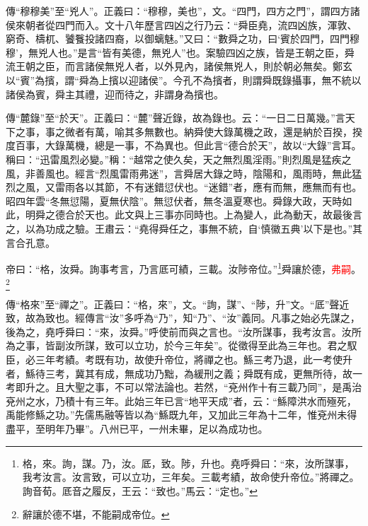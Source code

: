 {\noindent\zhuan{}\fzbyks 傳“穆穆美”至“兇人”。正義曰：“穆穆，美也”，文。“四門，四方之門”，謂四方諸侯來朝者從四門而入。文十八年歷言四凶之行乃云：“舜臣堯，流四凶族，渾敦、窮奇、檮杌、饕餮投諸四裔，以御螭魅。”又曰：“數舜之功，曰‘賓於四門，四門穆穆’，無兇人也。”是言“皆有美德，無兇人”也。案驗四凶之族，皆是王朝之臣，舜流王朝之臣，而言諸侯無兇人者，以外見內，諸侯無兇人，則於朝必無矣。鄭玄以“賓”為擯，謂“舜為上擯以迎諸侯”。今孔不為擯者，則謂舜既錄攝事，無不統以諸侯為賓，舜主其禮，迎而待之，非謂身為擯也。 \par}

{\noindent\zhuan{}\fzbyks 傳“麓錄”至“於天”。正義曰：“麓”聲近錄，故為錄也。云：“一日二日萬幾。”言天下之事，事之微者有萬，喻其多無數也。納舜使大錄萬機之政，還是納於百揆，揆度百事，大錄萬機，總是一事，不為異也。但此言“德合於天”，故以“大錄”言耳。稱曰：“迅雷風烈必變。”稱：“越常之使久矣，天之無烈風淫雨。”則烈風是猛疾之風，非善風也。經言“烈風雷雨弗迷”，言舜居大錄之時，陰陽和，風雨時，無此猛烈之風，又雷雨各以其節，不有迷錯愆伏也。“迷錯”者，應有而無，應無而有也。昭四年雲“冬無愆陽，夏無伏陰”。無愆伏者，無冬溫夏寒也。舜錄大政，天時如此，明舜之德合於天也。此文與上三事亦同時也。上為變人，此為動天，故最後言之，以為功成之驗。王肅云：“堯得舜任之，事無不統，自‘慎徽五典’以下是也。”其言合孔意。 \par}

帝曰：“格，汝舜。詢事考言，乃言厎可績，三載。汝陟帝位。”\footnote{格，來。詢，謀。乃，汝。厎，致。陟，升也。堯呼舜曰：“來，汝所謀事，我考汝言。汝言致，可以立功，三年矣。三載考績，故命使升帝位。”將禪之。詢音荀。厎音之履反，王云：“致也。”馬云：“定也。”}舜讓於德，\textcolor{red}{弗嗣}。\footnote{辭讓於德不堪，不能嗣成帝位。}

{\noindent\zhuan{}\fzbyks 傳“格來”至“禪之”。正義曰：“格，來”，文。“詢，謀”、“陟，升”文。“厎”聲近致，故為致也。經傳言“汝”多呼為“乃”，知“乃”、“汝”義同。凡事之始必先謀之，後為之，堯呼舜曰：“來，汝舜。”呼使前而與之言也。“汝所謀事，我考汝言。汝所為之事，皆副汝所謀，致可以立功，於今三年矣”。從徵得至此為三年也。君之馭臣，必三年考績。考既有功，故使升帝位，將禪之也。鯀三考乃退，此一考使升者，鯀待三考，冀其有成，無成功乃黜，為緩刑之義；舜既有成，更無所待，故一考即升之。且大聖之事，不可以常法論也。若然，“兗州作十有三載乃同”，是禹治兗州之水，乃積十有三年。此始三年已言“地平天成”者，云：“鯀障洪水而殛死，禹能修鯀之功。”先儒馬融等皆以為“鯀既九年，又加此三年為十二年，惟兗州未得盡平，至明年乃畢”。八州已平，一州未畢，足以為成功也。 \par}

